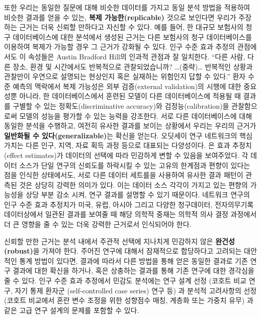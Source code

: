 \documentclass[11pt]{book}
\theoremstyle{definition}
\theoremstyle{definition}
\theoremstyle{definition}
\theoremstyle{remark}
\begin{document}
또한 우리는 동일한 질문에 대해 비슷한 데이터를 가지고 동일 분석 방법을
적용하여 비슷한 결과를 얻을 수 있는, \textbf{복제 가능한(replicable)}
것으로 보인다면 우리가 주장하는 근거는 더욱 신뢰할 만하다고 자신할 수
있다. 예를 들어, 한 대규모 보험사의 청구 데이터베이스에 대한 분석에서
생성된 근거는 다른 보험사의 청구 데이터베이스를 이용하여 복제가 가능할
경우 그 근거가 강화될 수 있다. 인구 수준 효과 추정의 관점에서도 이
속성들은 Austin Bradford Hill의 인과적 관점과 잘 일치한다. ``다른 사람,
다른 장소, 환경 및 시간에서도 반복적으로 관찰되었습니까?
\ldots{}(중략)\ldots{} 반복적인 상황과 관찰만이 우연으로 설명되는
현상인지 혹은 실재하는 위험인지 답할 수 있다.'' \citep{hill_1965} 환자
수준 예측의 맥락에서 복제 가능성은 외부 검증(external validation)의
시행에 대한 중요성뿐 아니라, 한 데이터베이스에서 훈련된 모델이 다른
데이터베이스에 적용될 때 결과를 구별할 수 있는 정확도(discriminative
accuracy)와 검정능(calibration)을 관찰함으로써 모델의 성능을 평가할 수
있는 능력을 강조한다. 서로 다른 데이터베이스에 대해 동일한 분석을
수행하고, 여전히 유사한 결과를 보이는 상황에서 우리는 우리의 근거가
\textbf{일반화될 수 있다(generalizable)}는 확신을 얻는다. 오딧세이 연구
네트워크의 핵심 가치는 다른 인구, 지역, 자료 획득 과정 등으로 대표되는
다양성이다. \citet{madigan_2013} 은 효과 추정치(effect estimates)가
데이터의 선택에 따라 민감하게 변할 수 있음을 보여주었다. 각 데이터
소스가 단일 연구의 신뢰도를 하락시킬 수 있는 고유의 한계점과 편향이
있다는 점을 인식한 상태에서도, 서로 다른 데이터 세트를을 사용하여 유사한
결과 패턴이 관측된 것은 상당히 강력한 의미가 있다. 이는 데이터 소스
각각이 가지고 있는 편향의 가능성을 상당 부분 감소 시켜, 연구 결과를
설명할 수 있기 때문이다. 네트워크 연구의 인구 수준 효과 추정치가 미국,
유럽, 아시아 그리고 다양한 청구데이터, 전자의무기록 데이터상에서 일관된
결과를 보여줄 때 해당 의학적 중재는 의학적 의사 결정 과정에서 더 큰
영향을 줄 수 있는 더욱 강력한 근거로서 인식되어야 한다.

신뢰할 만한 근거는 분석 내에서 주관적 선택에 지나치게 민감하지 않은
\textbf{완건성(robust)}을 가져야 한다. 주어진 연구에 대해서 잠재적으로
합당하다고 고려되는 대안적인 통계 방법이 있다면, 결과에 따라서 다른
방법을 통해 얻은 동일한 결과로 기존 연구 결과에 대한 확신을 하거나, 혹은
상충하는 결과를 통해 기존 연구에 대한 경각심을 줄 수 있다.
\citep{madigan2013design} 인구 수준 효과 추정에서 민감도 분석에는 연구
설계 선정 (코호트 비교 연구, 자기 통제 환자군 (self-controlled case
series) 연구 등) 과 분석적 고려사항의 선정 (코호트 비교에서 혼란 변수
조정을 위한 성향점수 매칭, 계층화 또는 가중치 유무) 과 같은 고급 연구
설계의 문제를 포함할 수 있다.
\end{document}
